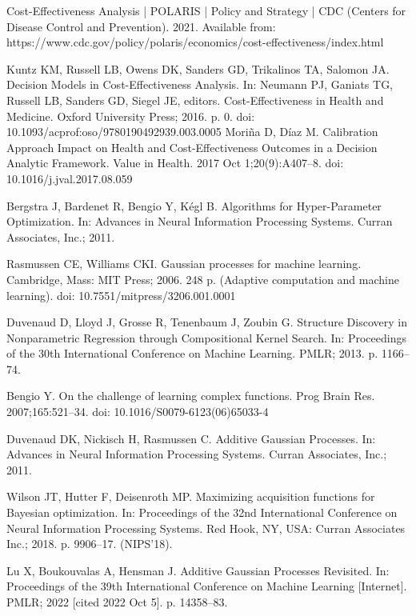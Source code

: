 \documentclass{IOS-Book-Article}
\begin{document}
	\begin{thebibliography}{99}
		
		Cost-Effectiveness Analysis | POLARIS | Policy and Strategy | CDC (Centers for Disease Control and Prevention). 2021. Available from: https://www.cdc.gov/policy/polaris/economics/cost-effectiveness/index.html
				
		Kuntz KM, Russell LB, Owens DK, Sanders GD, Trikalinos TA, Salomon JA. Decision Models in Cost-Effectiveness Analysis. In: Neumann PJ, Ganiats TG, Russell LB, Sanders GD, Siegel JE, editors. Cost-Effectiveness in Health and Medicine. Oxford University Press; 2016. p. 0. doi: 10.1093/acprof:oso/9780190492939.003.0005				
		Moriña D, Díaz M. Calibration Approach Impact on Health and Cost-Effectiveness Outcomes in a Decision Analytic Framework. Value in Health. 2017 Oct 1;20(9):A407–8. doi: 10.1016/j.jval.2017.08.059
		
		Bergstra J, Bardenet R, Bengio Y, Kégl B. Algorithms for Hyper-Parameter Optimization. In: Advances in Neural Information Processing Systems. Curran Associates, Inc.; 2011.
		
		Rasmussen CE, Williams CKI. Gaussian processes for machine learning. Cambridge, Mass: MIT Press; 2006. 248 p. (Adaptive computation and machine learning). doi: 10.7551/mitpress/3206.001.0001
		
		Duvenaud D, Lloyd J, Grosse R, Tenenbaum J, Zoubin G. Structure Discovery in Nonparametric Regression through Compositional Kernel Search. In: Proceedings of the 30th International Conference on Machine Learning. PMLR; 2013. p. 1166–74.
			
		Bengio Y. On the challenge of learning complex functions. Prog Brain Res. 2007;165:521–34. doi: 10.1016/S0079-6123(06)65033-4 
		
		Duvenaud DK, Nickisch H, Rasmussen C. Additive Gaussian Processes. In: Advances in Neural Information Processing Systems. Curran Associates, Inc.; 2011.
		
		Wilson JT, Hutter F, Deisenroth MP. Maximizing acquisition functions for Bayesian optimization. In: Proceedings of the 32nd International Conference on Neural Information Processing Systems. Red Hook, NY, USA: Curran Associates Inc.; 2018. p. 9906–17. (NIPS’18). 
		
		Lu X, Boukouvalas A, Hensman J. Additive Gaussian Processes Revisited. In: Proceedings of the 39th International Conference on Machine Learning [Internet]. PMLR; 2022 [cited 2022 Oct 5]. p. 14358–83.
		

\end{thebibliography}
\end{document}
